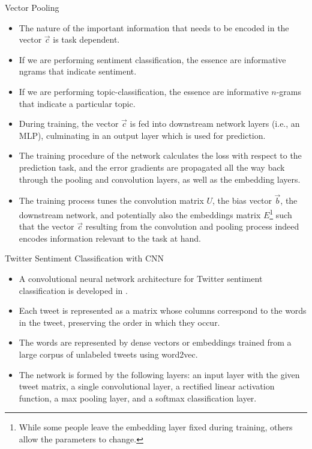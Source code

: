 \documentclass[handout]{beamer}
\begin{document}
\begin{frame}{Vector Pooling}
\begin{scriptsize}
\begin{itemize}
\item The nature of the important information that needs to be encoded in the vector $\vec{c}$ is task dependent. 
\item If we are performing sentiment classification, the essence are informative ngrams that indicate
sentiment.
\item If we are performing topic-classification, the essence are informative $n$-grams that indicate a particular topic.

\item During training, the vector $\vec{c}$ is fed into downstream network layers (i.e., an MLP), culminating in an output layer which is used for prediction.
\item The training procedure of the network calculates the loss with respect to the prediction task, and the error gradients are propagated all the way back through the pooling and convolution layers, as well as the embedding layers. 
\item The training process tunes the convolution matrix $U$, the bias vector $\vec{b}$, the downstream network, and
potentially also the embeddings matrix $E$\footnote{While some people leave the embedding layer fixed during training, others allow the parameters to change.}  such that the vector $\vec{c}$ resulting from the convolution
and pooling process indeed encodes information relevant to the task at hand.
\end{itemize}
\end{scriptsize}
\end{frame}



\begin{frame}{Twitter Sentiment Classification with CNN}
\begin{scriptsize}
\begin{itemize}
\item A convolutional neural network architecture for Twitter sentiment classification is developed in \cite{Severyn2015}.
\item  Each tweet is represented as a matrix whose columns correspond to the words in the tweet, preserving the order in which they occur.
\item  The words are represented by dense vectors or embeddings trained from a large corpus of unlabeled tweets using word2vec.
\item  The network is formed by the following layers: an input layer with the given tweet matrix, a  single  convolutional layer, a rectified linear activation function, a max pooling layer, and a softmax classification layer.
\end{itemize}
\end{scriptsize}
\end{frame}
\end{document}
